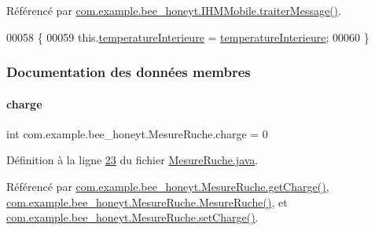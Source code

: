 Référencé par \hyperlink{_i_h_m_mobile_8java_source_l00374}{com.\+example.\+bee\+\_\+honeyt.\+I\+H\+M\+Mobile.\+traiter\+Message()}.


\begin{DoxyCode}
00058     \{
00059         this.\hyperlink{classcom_1_1example_1_1bee__honeyt_1_1_mesure_ruche_afd0ecabb4e519d5bcfee33ac15b8b742}{temperatureInterieure} = \hyperlink{classcom_1_1example_1_1bee__honeyt_1_1_mesure_ruche_afd0ecabb4e519d5bcfee33ac15b8b742}{temperatureInterieure};
00060     \}
\end{DoxyCode}


\subsubsection{Documentation des données membres}
\mbox{\label{classcom_1_1example_1_1bee__honeyt_1_1_mesure_ruche_a5ac02bc1d6195faa400e5a3171eed3f4}} 
\paragraph{\texorpdfstring{charge}{charge}}
{\footnotesize\ttfamily int com.\+example.\+bee\+\_\+honeyt.\+Mesure\+Ruche.\+charge = 0\hspace{0.3cm}{\ttfamily [private]}}



Définition à la ligne \hyperlink{_mesure_ruche_8java_source_l00023}{23} du fichier \hyperlink{_mesure_ruche_8java_source}{Mesure\+Ruche.\+java}.



Référencé par \hyperlink{_mesure_ruche_8java_source_l00112}{com.\+example.\+bee\+\_\+honeyt.\+Mesure\+Ruche.\+get\+Charge()}, \hyperlink{_mesure_ruche_8java_source_l00030}{com.\+example.\+bee\+\_\+honeyt.\+Mesure\+Ruche.\+Mesure\+Ruche()}, et \hyperlink{_mesure_ruche_8java_source_l00114}{com.\+example.\+bee\+\_\+honeyt.\+Mesure\+Ruche.\+set\+Charge()}.

\mbox{\label{classcom_1_1example_1_1bee__honeyt_1_1_mesure_ruche_aa5521e97dfa98051bff9fd8d3ca3f34d}} 
